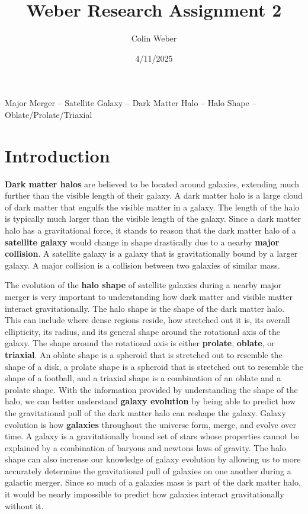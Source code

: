 \documentclass[fleqn,usenatbib]{mnras}
\title[Short title, max. 45 characters]{Weber Research Assignment 2}
\author{Colin Weber}
\date{4/11/2025}
\begin{document}
\label{firstpage}
\pagerange{\pageref{firstpage}--\pageref{lastpage}}
\maketitle

\begin{keywords}
Major Merger -- Satellite Galaxy -- Dark Matter Halo -- Halo Shape -- Oblate/Prolate/Triaxial

\end{keywords}
\section{Introduction}
        \textbf{Dark matter halos} are believed to be located around galaxies, extending much further than the visible length of their galaxy. A dark matter halo is a large cloud of dark matter that engulfs the visible matter in a galaxy. The length of the halo is typically much larger than the visible length of the galaxy. Since a dark matter halo has a gravitational force, it stands to reason that the dark matter halo of a \textbf{satellite galaxy} would change in shape drastically due to a nearby \textbf{major collision}. A satellite galaxy is a galaxy that is gravitationally bound by a larger galaxy. A major collision is a collision between two galaxies of similar mass.

        The evolution of the \textbf{halo shape} of satellite galaxies during a nearby major merger is very important to understanding how dark matter and visible matter interact gravitationally. The halo shape is the shape of the dark matter halo. This can include where dense regions reside, how stretched out it is, its overall ellipticity, its radius, and its general shape around the rotational axis of the galaxy. The shape around the rotational axis is either \textbf{prolate}, \textbf{oblate}, or \textbf{triaxial}. An oblate shape is a spheroid that is stretched out to resemble the shape of a disk, a prolate shape is a spheroid that is stretched out to resemble the shape of a football, and a triaxial shape is a combination of an oblate and a prolate shape. With the information provided by understanding the shape of the halo, we can better understand \textbf{galaxy evolution} by being able to predict how the gravitational pull of the dark matter halo can reshape the galaxy. Galaxy evolution is how \textbf{galaxies} throughout the universe form, merge, and evolve over time. A galaxy is a gravitationally bound set of stars whose properties cannot be explained by a combination of baryons and newtons laws of gravity. The halo shape can also increase our knowledge of galaxy evolution by allowing us to more accurately determine the gravitational pull of galaxies on one another during a galactic merger. Since so much of a galaxies mass is part of the dark matter halo, it would be nearly impossible to predict how galaxies interact gravitationally without it. 
\end{document}
